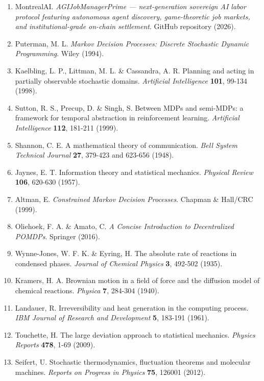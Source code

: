 \begin{enumerate}
\def\labelenumi{\arabic{enumi}.}
\tightlist
\item
  MontrealAI. \emph{AGIJobManagerPrime --- next-generation sovereign AI
  labor protocol featuring autonomous agent discovery, game-theoretic
  job markets, and institutional-grade on-chain settlement}. GitHub
  repository (2026).
\item
  Puterman, M. L. \emph{Markov Decision Processes: Discrete Stochastic
  Dynamic Programming}. Wiley (1994).
\item
  Kaelbling, L. P., Littman, M. L. \& Cassandra, A. R. Planning and
  acting in partially observable stochastic domains. \emph{Artificial
  Intelligence} \textbf{101}, 99-134 (1998).
\item
  Sutton, R. S., Precup, D. \& Singh, S. Between MDPs and semi-MDPs: a
  framework for temporal abstraction in reinforcement learning.
  \emph{Artificial Intelligence} \textbf{112}, 181-211 (1999).
\item
  Shannon, C. E. A mathematical theory of communication. \emph{Bell
  System Technical Journal} \textbf{27}, 379-423 and 623-656 (1948).
\item
  Jaynes, E. T. Information theory and statistical mechanics.
  \emph{Physical Review} \textbf{106}, 620-630 (1957).
\item
  Altman, E. \emph{Constrained Markov Decision Processes}. Chapman \&
  Hall/CRC (1999).
\item
  Oliehoek, F. A. \& Amato, C. \emph{A Concise Introduction to
  Decentralized POMDPs}. Springer (2016).
\item
  Wynne-Jones, W. F. K. \& Eyring, H. The absolute rate of reactions in
  condensed phases. \emph{Journal of Chemical Physics} \textbf{3},
  492-502 (1935).
\item
  Kramers, H. A. Brownian motion in a field of force and the diffusion
  model of chemical reactions. \emph{Physica} \textbf{7}, 284-304
  (1940).
\item
  Landauer, R. Irreversibility and heat generation in the computing
  process. \emph{IBM Journal of Research and Development} \textbf{5},
  183-191 (1961).
\item
  Touchette, H. The large deviation approach to statistical mechanics.
  \emph{Physics Reports} \textbf{478}, 1-69 (2009).
\item
  Seifert, U. Stochastic thermodynamics, fluctuation theorems and
  molecular machines. \emph{Reports on Progress in Physics} \textbf{75},
  126001 (2012).

\end{enumerate}
